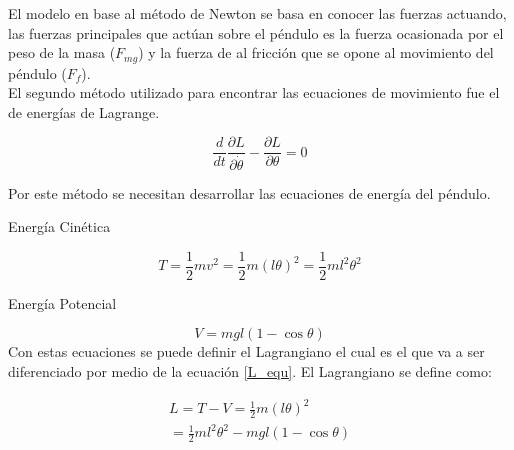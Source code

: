 El modelo en base al método de Newton se basa en conocer las fuerzas actuando, las fuerzas principales que actúan sobre el péndulo es la fuerza ocasionada por el peso de la masa ($F_{mg}$) y la fuerza de al fricción que se opone al movimiento del péndulo ($F_f$).\\

El segundo método utilizado para encontrar las ecuaciones de movimiento fue el de energías de Lagrange.
\begin{large}
\begin{equation} \label{L_equ}
\dfrac{d}{dt} \dfrac{\partial L}{\partial \dot{\theta}} - \dfrac{\partial L}{\partial\theta} = 0
\end{equation}
\end{large}
Por este método se necesitan desarrollar las ecuaciones de energía del péndulo.\\
\begin{flushleft}
{\large Energía Cinética}
\end{flushleft}
\begin{equation} \label{T_equ}
T = \frac{1}{2}mv^2 = \frac{1}{2}m(l\theta)^2 = \frac{1}{2}ml^2\theta^2 
\end{equation}
\begin{flushleft}
{\large Energía Potencial}
\end{flushleft}
\begin{equation} \label{V_equ}
V = mgl(1-\cos \theta)
\end{equation}
Con estas ecuaciones se puede definir el Lagrangiano el cual es el que va a ser diferenciado por medio de la ecuación \ref{L_equ}. El Lagrangiano se define como:

\begin{large}
\begin{align*}
L = T - V = \frac{1}{2}m(l\theta)^2 \\
= \frac{1}{2}ml^2\theta^2 - mgl(1-\cos \theta)
\end{align*}
\end{large}

